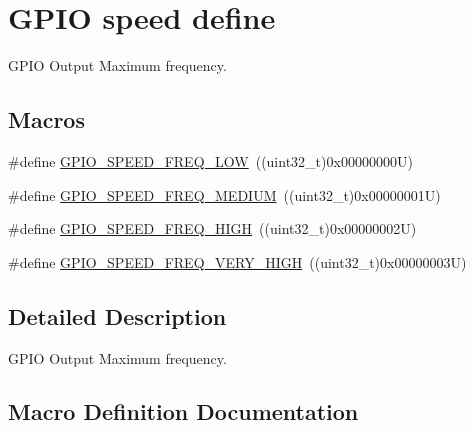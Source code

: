 \hypertarget{group___g_p_i_o__speed__define}{}\section{G\+P\+IO speed define}
\label{group___g_p_i_o__speed__define}


G\+P\+IO Output Maximum frequency.  


\subsection*{Macros}
\begin{DoxyCompactItemize}
\item 
\#define \mbox{\hyperlink{group___g_p_i_o__speed__define_gab7916c4265bfa1b26a5205ea9c1caa4e}{G\+P\+I\+O\+\_\+\+S\+P\+E\+E\+D\+\_\+\+F\+R\+E\+Q\+\_\+\+L\+OW}}~((uint32\+\_\+t)0x00000000\+U)
\item 
\#define \mbox{\hyperlink{group___g_p_i_o__speed__define_ga1724a25a9cf00ebf485daeb09cfa1e25}{G\+P\+I\+O\+\_\+\+S\+P\+E\+E\+D\+\_\+\+F\+R\+E\+Q\+\_\+\+M\+E\+D\+I\+UM}}~((uint32\+\_\+t)0x00000001\+U)
\item 
\#define \mbox{\hyperlink{group___g_p_i_o__speed__define_gaef5898db71cdb957cd41f940b0087af8}{G\+P\+I\+O\+\_\+\+S\+P\+E\+E\+D\+\_\+\+F\+R\+E\+Q\+\_\+\+H\+I\+GH}}~((uint32\+\_\+t)0x00000002\+U)
\item 
\#define \mbox{\hyperlink{group___g_p_i_o__speed__define_ga1944cf10e2ab172810d38b681d40b771}{G\+P\+I\+O\+\_\+\+S\+P\+E\+E\+D\+\_\+\+F\+R\+E\+Q\+\_\+\+V\+E\+R\+Y\+\_\+\+H\+I\+GH}}~((uint32\+\_\+t)0x00000003\+U)
\end{DoxyCompactItemize}


\subsection{Detailed Description}
G\+P\+IO Output Maximum frequency. 



\subsection{Macro Definition Documentation}
\mbox{\label{group___g_p_i_o__speed__define_gaef5898db71cdb957cd41f940b0087af8}} 

